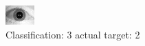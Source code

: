 \begin{figure}[h!]
\begin{center}
\includegraphics[width=0.60\columnwidth]{figures/ID1794_class_3_target_2.png}
\end{center}
\caption{ Classification: 3 actual target: 2}
\label{fig:ID1794_class_3_target_2}
\end{figure}
